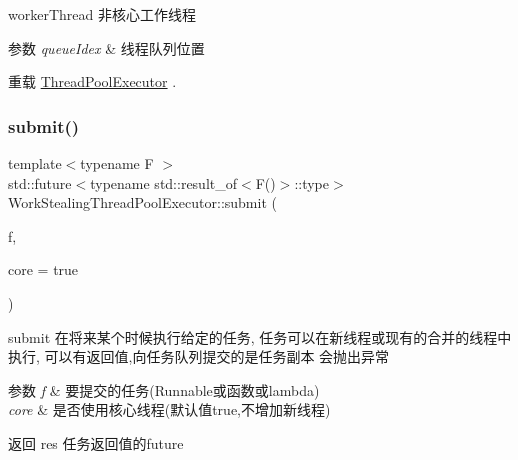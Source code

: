 worker\+Thread 非核心工作线程 


\begin{DoxyParams}{参数}
{\em queue\+Idex} & 线程队列位置 \\
\hline
\end{DoxyParams}


重载 \hyperlink{classThreadPoolExecutor_a5e40839bf4191b5eab9d81227ddb62c3}{Thread\+Pool\+Executor} .

\mbox{\label{classWorkStealingThreadPoolExecutor_a7fa1b79c8be2b06a7952ccfd14aa7f6c}} 
\subsubsection{\texorpdfstring{submit()}{submit()}}
{\footnotesize\ttfamily template$<$typename F $>$ \\
std\+::future$<$typename std\+::result\+\_\+of$<$F()$>$\+::type$>$ Work\+Stealing\+Thread\+Pool\+Executor\+::submit (\begin{DoxyParamCaption}\item[{F}]{f,  }\item[{bool}]{core = {\ttfamily true} }\end{DoxyParamCaption})\hspace{0.3cm}{\ttfamily [inline]}}



submit 在将来某个时候执行给定的任务, 任务可以在新线程或现有的合并的线程中执行, 可以有返回值,向任务队列提交的是任务副本 会抛出异常 


\begin{DoxyParams}{参数}
{\em f} & 要提交的任务(Runnable或函数或lambda) \\
\hline
{\em core} & 是否使用核心线程(默认值true,不增加新线程)\\
\hline
\end{DoxyParams}
\begin{DoxyReturn}{返回}
res 任务返回值的future 
\end{DoxyReturn}
\mbox{\label{classWorkStealingThreadPoolExecutor_ab0414f5e006e8fc523bfd35ba276f705}} 
